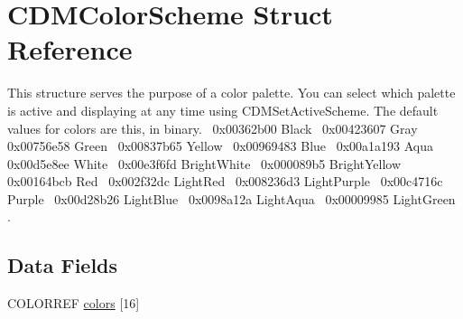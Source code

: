 \hypertarget{struct_c_d_m_color_scheme}{}\section{C\+D\+M\+Color\+Scheme Struct Reference}
\label{struct_c_d_m_color_scheme}


This structure serves the purpose of a color palette. You can select which palette is active and displaying at any time using C\+D\+M\+Set\+Active\+Scheme. The default values for colors are this, in binary.~\newline
 0x00362b00 Black~\newline
 0x00423607 Gray~\newline
 0x00756e58 Green~\newline
 0x00837b65 Yellow~\newline
 0x00969483 Blue~\newline
 0x00a1a193 Aqua~\newline
 0x00d5e8ee White~\newline
 0x00e3f6fd Bright\+White~\newline
 0x000089b5 Bright\+Yellow~\newline
 0x00164bcb Red~\newline
 0x002f32dc Light\+Red~\newline
 0x008236d3 Light\+Purple~\newline
 0x00c4716c Purple~\newline
 0x00d28b26 Light\+Blue~\newline
 0x0098a12a Light\+Aqua~\newline
 0x00009985 Light\+Green~\newline
.  


\subsection*{Data Fields}
\begin{DoxyCompactItemize}
\item 
C\+O\+L\+O\+R\+R\+EF \mbox{\hyperlink{struct_c_d_m_color_scheme_a5b8477f088551d8fc001899358e29a43}{colors}} \mbox{[}16\mbox{]}
\end{DoxyCompactItemize}


